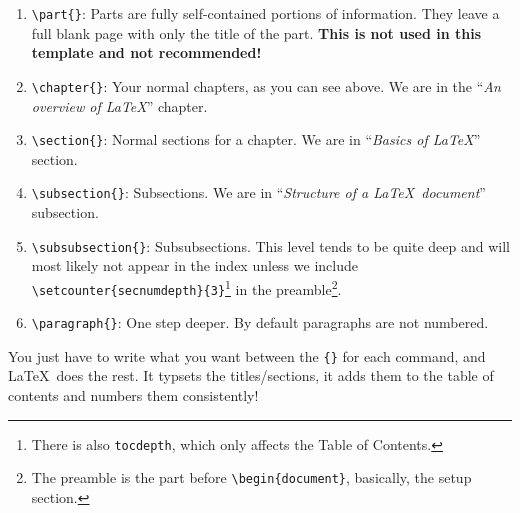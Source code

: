 \begin{enumerate}
	\item \verb|\part{}|: Parts are fully self-contained portions of information. They leave a full blank page with only the title of the part. \textbf{This is not used in this template and not recommended!}
	\item \verb|\chapter{}|: Your normal chapters, as you can see above. We are in the ``\emph{An overview of \LaTeX }'' chapter.
	\item \verb|\section{}|: Normal sections for a chapter. We are in ``\emph{Basics of \LaTeX}'' section.
	\item \verb|\subsection{}|: Subsections. We are in ``\emph{Structure of a \LaTeX\ document}'' subsection.
	\item \verb|\subsubsection{}|: Subsubsections. This level tends to be quite deep and will most likely not appear in the index unless we include \verb|\setcounter{secnumdepth}{3}|\footnote{There is also \texttt{tocdepth}, which only affects the Table of Contents.} in the preamble\footnote{The preamble is the part before \texttt{\textbackslash begin\{document\}}, basically, the setup section.}.
	\item \verb|\paragraph{}|: One step deeper. By default paragraphs are not numbered.
\end{enumerate}

You just have to write what you want between the \verb|{}| for each command, and \LaTeX\ does the rest. It typsets the titles/sections, it adds them to the table of contents and numbers them consistently!

